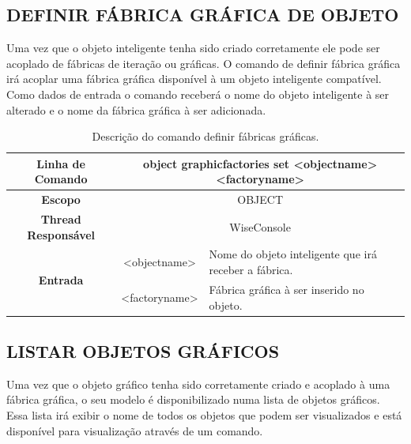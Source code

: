 \subsection{DEFINIR FÁBRICA GRÁFICA DE OBJETO}\label{sec:graphic_factories_set}

Uma vez que o objeto inteligente tenha sido criado corretamente ele pode ser acoplado de fábricas de iteração ou gráficas. O comando de definir fábrica gráfica irá acoplar uma fábrica gráfica disponível à um objeto inteligente compatível. Como dados de entrada o comando receberá o nome do objeto inteligente à ser alterado e o nome da fábrica gráfica à ser adicionada.

\begin{center}
	\begin{table}[!htbp]
		\begin{tabular}{|c|c|m{}|}
			\hline
			\textbf{Linha de Comando} & \multicolumn{2}{c|}{object graphic\underline{\space\space}factories set <object\underline{\space\space}name> <factory\underline{\space\space}name>} \\
			\hline
			\textbf{Escopo} & \multicolumn{2}{c|}{OBJECT} \\
			\hline
			\textbf{Thread Responsável} & \multicolumn{2}{c|}{WiseConsole} \\
			\hline
			\multirow{2}{*}{\textbf{Entrada}} & <object\underline{\space\space}name> & Nome do objeto inteligente que irá receber a fábrica. \\
			& <factory\underline{\space\space}name> & Fábrica gráfica à ser inserido no objeto. \\
			\hline
		\end{tabular}
		\caption{Descrição do comando definir fábricas gráficas.}
		\label{tab:graphic_factories_set}
	\end{table}
\end{center}

\subsection{LISTAR OBJETOS GRÁFICOS}\label{sec:graphic_list}

Uma vez que o objeto gráfico tenha sido corretamente criado e acoplado à uma fábrica gráfica, o seu modelo é disponibilizado numa lista de objetos gráficos. Essa lista irá exibir o nome de todos os objetos que podem ser visualizados e está disponível para visualização através de um comando.


